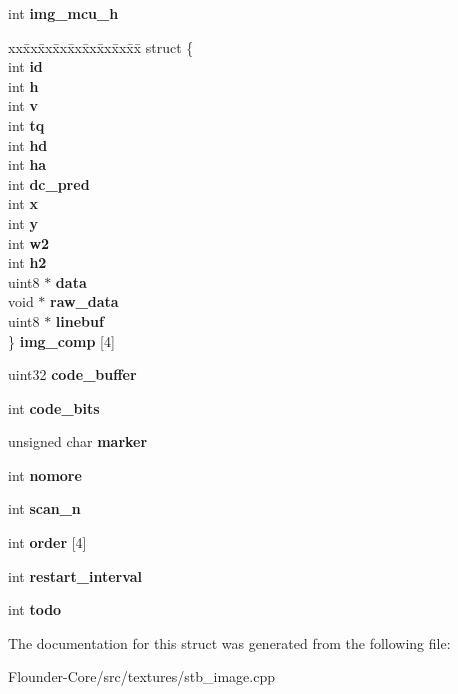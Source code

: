 \begin{DoxyCompactItemize}
int {\bfseries img\+\_\+mcu\+\_\+h}
\item 
\mbox{\label{structjpeg_a1c4874d5cf0e2b80dc0d0b47ddd8be7a}} 
\begin{tabbing}
xx\=xx\=xx\=xx\=xx\=xx\=xx\=xx\=xx\=\kill
struct \{\\
\>int {\bfseries id}\\
\>int {\bfseries h}\\
\>int {\bfseries v}\\
\>int {\bfseries tq}\\
\>int {\bfseries hd}\\
\>int {\bfseries ha}\\
\>int {\bfseries dc\_pred}\\
\>int {\bfseries x}\\
\>int {\bfseries y}\\
\>int {\bfseries w2}\\
\>int {\bfseries h2}\\
\>uint8 $\ast$ {\bfseries data}\\
\>void $\ast$ {\bfseries raw\_data}\\
\>uint8 $\ast$ {\bfseries linebuf}\\
\} {\bfseries img\_comp} \mbox{[}4\mbox{]}\\

\end{tabbing}\item 
\mbox{\label{structjpeg_abfc7f6a333ba3517e669e3e58113bbca}} 
uint32 {\bfseries code\+\_\+buffer}
\item 
\mbox{\label{structjpeg_a6d1b20b5d9d253006fde4e4dd8ab8c04}} 
int {\bfseries code\+\_\+bits}
\item 
\mbox{\label{structjpeg_a9a5cd40790fd432795fb19477c921f8c}} 
unsigned char {\bfseries marker}
\item 
\mbox{\label{structjpeg_a2d114f4d52f50d8d85f43b2a3f161cec}} 
int {\bfseries nomore}
\item 
\mbox{\label{structjpeg_adca2f04da72e50086c77c7070731a679}} 
int {\bfseries scan\+\_\+n}
\item 
\mbox{\label{structjpeg_ac0f5240fc472e75239328f51a50f45b6}} 
int {\bfseries order} \mbox{[}4\mbox{]}
\item 
\mbox{\label{structjpeg_ab13af34259b1f1c6cf8f35411a77e39e}} 
int {\bfseries restart\+\_\+interval}
\item 
\mbox{\label{structjpeg_a6b4a8a352872847d84ea5ef1a4bc245e}} 
int {\bfseries todo}
\end{DoxyCompactItemize}


The documentation for this struct was generated from the following file\+:\begin{DoxyCompactItemize}
\item 
Flounder-\/\+Core/src/textures/stb\+\_\+image.\+cpp\end{DoxyCompactItemize}
